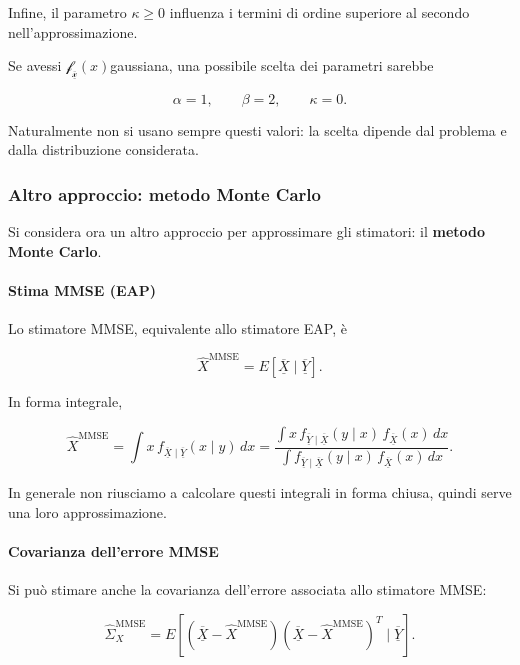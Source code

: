 \documentclass[11pt,a4paper]{article}
\begin{document}
Infine, il parametro \(\kappa\geq 0\) influenza i termini di ordine superiore al secondo nell'approssimazione.

Se avessi $\mathcal{f_{\overline{\underline{x}}}}(x) $gaussiana, una possibile scelta dei parametri sarebbe

\[
\alpha=1,
\qquad
\beta=2,
\qquad
\kappa=0.
\]

Naturalmente non si usano sempre questi valori: la scelta dipende dal problema e dalla distribuzione considerata.

\subsubsection*{Altro approccio: metodo Monte Carlo}

Si considera ora un altro approccio per approssimare gli stimatori: il \textbf{metodo Monte Carlo}.

\paragraph{Stima MMSE (EAP)}

Lo stimatore MMSE, equivalente allo stimatore EAP, è

\[
\hat X^{\mathrm{MMSE}}
=
E[\overline{\underline{X}}\mid \overline{\underline{Y}}].
\]

In forma integrale,

\[
\hat X^{\mathrm{MMSE}}
=
\int x\, f_{\overline{\underline{X}}\mid \overline{\underline{Y}}}(x\mid y)\,dx = \frac{
\displaystyle
\int x\, f_{\overline{\underline{Y}}\mid \overline{\underline{X}}}(y\mid x)\,f_{\overline{\underline{X}}}(x)\,dx
}{
\displaystyle
\int f_{\overline{\underline{Y}}\mid \overline{\underline{X}}}(y\mid x)\,f_{\overline{\underline{X}}}(x)\,dx
}.
\]


In generale non riusciamo a calcolare questi integrali in forma chiusa, quindi serve una loro approssimazione.

\paragraph{Covarianza dell'errore MMSE}

Si può stimare anche la covarianza dell'errore associata allo stimatore MMSE:

\[
\hat\Sigma_X^{\mathrm{MMSE}}
=
E\!\left[
(\overline{\underline{X}}-\hat X^{\mathrm{MMSE}})
(\overline{\underline{X}}-\hat X^{\mathrm{MMSE}})^T
\mid \overline{\underline{Y}}
\right].
\]
\end{document}
